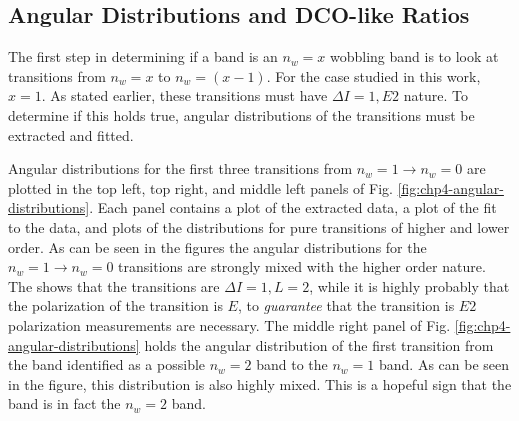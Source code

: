 \subsection{Angular Distributions and DCO-like Ratios}
\label{ssec:trw-lvl-angles}

The first step in determining if a band is an $n_w=x$ wobbling band is to look at transitions from $n_w=x$ to $n_w=(x-1)$. For the case studied in this work, $x=1$. As stated earlier, these transitions must have $\Delta{}I=1, E2$ nature. To determine if this holds true, angular distributions of the transitions must be extracted and fitted.

Angular distributions for the first three transitions from $n_w=1\rightarrow{}n_w=0$ are plotted in the top left, top right, and middle left panels of Fig. \ref{fig:chp4-angular-distributions}. Each panel contains a plot of the extracted data, a plot of the fit to the data, and plots of the distributions for pure transitions of higher and lower order. As can be seen in the figures the angular distributions for the $n_w=1\rightarrow{}n_w=0$ transitions are strongly mixed with the higher order nature. The shows that the transitions are $\Delta{}I=1, L=2$, while it is highly probably that the polarization of the transition is $E$, to \emph{guarantee} that the transition is $E2$ polarization measurements are necessary. The middle right panel of Fig. \ref{fig:chp4-angular-distributions} holds the angular distribution of the first transition from the band identified as a possible $n_w=2$ band to the $n_w=1$ band. As can be seen in the figure, this distribution is also highly mixed. This is a hopeful sign that the band is in fact the $n_w=2$ band. 

